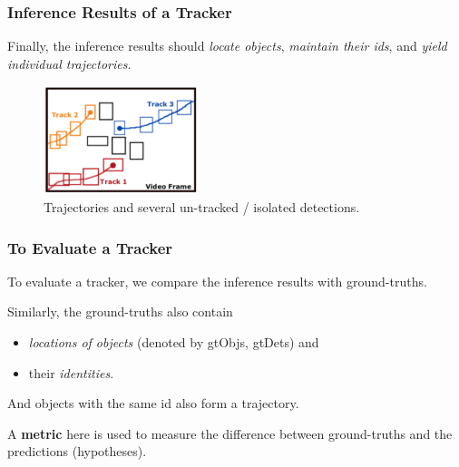 \documentclass[slidetop, mathserif]{beamer}
\begin{document}
\begin{frame}
	\frametitle{Inference Results of a Tracker}

	Finally, the inference results should \emph{locate objects},
	\emph{maintain their ids},
	and \emph{yield individual trajectories}.

	\begin{figure}
		\includegraphics[height=90pt]{pics/fig1.png}
		\caption{Trajectories and several un-tracked / isolated detections.}
	\end{figure}

\end{frame}

\begin{frame}
	\frametitle{To Evaluate a Tracker}

	To evaluate a tracker, we compare the inference results with ground-truths.

	\quad

	Similarly, the ground-truths also contain
	\begin{itemize}
	\item \emph{locations of objects} (denoted by gtObjs, gtDets) and
	\item their \emph{identities}.
	\end{itemize}
	And objects with the same id also form a trajectory.

	\quad

	A {\bf metric} here is used to measure the difference between
	ground-truths and the predictions (hypotheses).

\end{frame}
\end{document}
